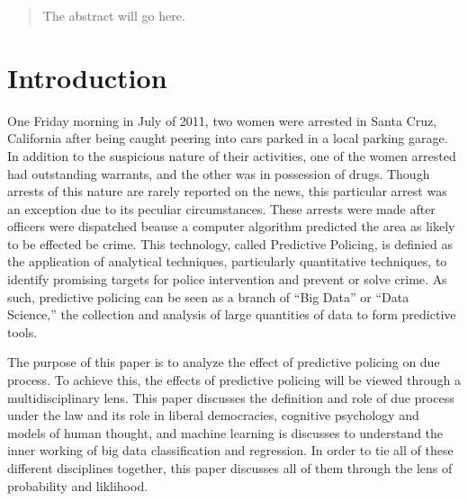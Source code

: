 \documentclass[12pt]{article} %
\begin{document}
\clearpage\thispagestyle{empty}\addtocounter{page}{-1}
\tableofcontents %
\newpage %


\begin{abstract}
The abstract will go here.
\end{abstract}
\newpage
\section{Introduction}\label{sec:introduction} %

One Friday morning in July of 2011, two women were arrested in Santa Cruz, California after being caught peering into cars parked in a local parking garage. In addition to the suspicious nature of their activities, one of the women arrested had outstanding warrants, and the other was in possession of drugs. Though arrests of this nature are rarely reported on the news, this particular arrest was an exception due to its peculiar circumstances. These arrests were made after officers were dispatched beause a computer algorithm predicted the area as likely to be effected be crime. \cite{nyt} 
This technology, called Predictive Policing, is definied as the application of analytical techniques, particularly quantitative techniques, to identify promising targets for police intervention and prevent or solve crime. \cite{perryetal} As such, predictive policing can be seen as a branch of ``Big Data'' or ``Data Science,'' the collection and analysis of large quantities of data to form predictive tools.

The purpose of this paper is to analyze the effect of predictive policing on due process. To achieve this, the effects of predictive policing will be viewed through a multidisciplinary lens. This paper discusses the definition and role of due process under the law and its role in liberal democracies, cognitive psychology and models of human thought, and machine learning is discusses to understand the inner working of big data classification and regression. In order to tie all of these different disciplines together, this paper discusses all of them through the lens of probability and liklihood.
\end{document}
